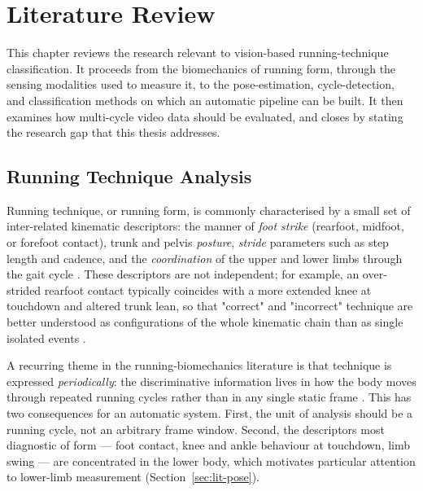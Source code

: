 %
%

\chapter{Literature Review}
\label{ch:literature-review}

This chapter reviews the research relevant to vision-based running-technique
classification. It proceeds from the biomechanics of running form, through the
sensing modalities used to measure it, to the pose-estimation, cycle-detection,
and classification methods on which an automatic pipeline can be built. It then
examines how multi-cycle video data should be evaluated, and closes by stating
the research gap that this thesis addresses.

\section{Running Technique Analysis}
\label{sec:lit-running}

Running technique, or running form, is commonly characterised by a small set of
inter-related kinematic descriptors: the manner of \emph{foot strike} (rearfoot,
midfoot, or forefoot contact), trunk and pelvis \emph{posture}, \emph{stride}
parameters such as step length and cadence, and the \emph{coordination} of the
upper and lower limbs through the gait cycle
\cite{novacheck1998biomechanics, inostroza2025runningcycle}. These
descriptors are not independent; for example, an over-strided rearfoot contact
typically coincides with a more extended knee at touchdown and altered trunk
lean, so that "correct" and "incorrect" technique are better understood as
configurations of the whole kinematic chain than as single isolated events
\cite{dicharry2010kinematics}.

A recurring theme in the running-biomechanics literature is that technique is
expressed \emph{periodically}: the discriminative information lives in how the
body moves through repeated running cycles rather than in any single static
frame \cite{inostroza2025runningcycle, cutting1978gaitperiodicity}. This has two
consequences for an automatic system. First, the unit of analysis should be a
running cycle, not an arbitrary frame window. Second, the descriptors most
diagnostic of form --- foot contact, knee and ankle behaviour at touchdown, limb
swing --- are concentrated in the lower body, which motivates particular
attention to lower-limb measurement (Section~\ref{sec:lit-pose}).

